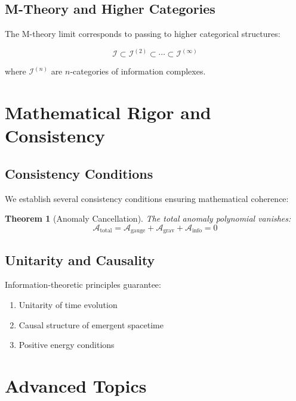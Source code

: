 \documentclass[12pt,a4paper]{article}
\newtheorem{theorem}{Theorem}[section]
\begin{document}
\subsection{M-Theory and Higher Categories}

The M-theory limit corresponds to passing to higher categorical structures:

\begin{equation}
\mathcal{I} \subset \mathcal{I}^{(2)} \subset \cdots \subset \mathcal{I}^{(\infty)}
\end{equation}

where $\mathcal{I}^{(n)}$ are $n$-categories of information complexes.

\section{Mathematical Rigor and Consistency}

\subsection{Consistency Conditions}

We establish several consistency conditions ensuring mathematical coherence:

\begin{theorem}[Anomaly Cancellation]
The total anomaly polynomial vanishes:
\begin{equation}
\mathcal{A}_{\text{total}} = \mathcal{A}_{\text{gauge}} + \mathcal{A}_{\text{grav}} + \mathcal{A}_{\text{info}} = 0
\end{equation}
\end{theorem}

\subsection{Unitarity and Causality}

Information-theoretic principles guarantee:
\begin{enumerate}
\item Unitarity of time evolution
\item Causal structure of emergent spacetime
\item Positive energy conditions
\end{enumerate}

\section{Advanced Topics}
\end{document}
